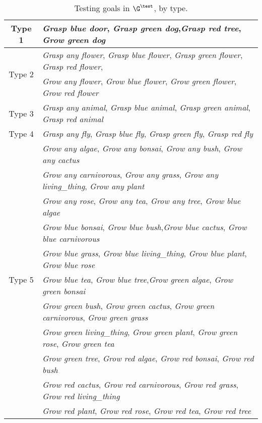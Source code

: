 \begin{table}[!h]
    \centering
    \caption{Testing goals in $\G^\test$, by type.}
    \label{tab:test_descriptions}
    \begin{tabular}{c|l}
        Type 1 & \textit{Grasp blue door}, \textit{Grasp green dog},\textit{Grasp red tree}, \textit{Grow green dog} \\ 
        \hline
        \multirow{2}{2.75em}{Type 2} & \textit{Grasp any flower}, \textit{Grasp blue flower}, \textit{Grasp green flower}, \textit{Grasp red flower}, \\
                                     & \textit{Grow any flower}, \textit{Grow blue flower}, \textit{Grow green flower}, \textit{Grow red flower}\\
        \hline
        Type 3 & \textit{Grasp any animal}, \textit{Grasp blue animal}, \textit{Grasp green animal}, \textit{Grasp red animal} \\ 
        \hline
       Type 4 & \textit{Grasp any fly}, \textit{Grasp blue fly}, \textit{Grasp green fly}, \textit{Grasp red fly} \\ 
        \hline
        \multirow{11}{2.75em}{Type 5} & \textit{Grow any algae}, \textit{Grow any bonsai}, \textit{Grow any bush}, \textit{Grow any cactus}\\
                                     & \textit{Grow any carnivorous}, \textit{Grow any grass}, \textit{Grow any living\_thing}, \textit{Grow any plant}\\
                                     & \textit{Grow any rose}, \textit{Grow any tea}, \textit{Grow any tree}, \textit{Grow blue algae}\\
                                     & \textit{Grow blue bonsai}, \textit{Grow blue bush},\textit{Grow blue cactus}, \textit{Grow blue carnivorous}\\
                                     & \textit{Grow blue grass}, \textit{Grow blue living\_thing}, \textit{Grow blue plant}, \textit{Grow blue rose}\\
                                     & \textit{Grow blue tea}, \textit{Grow blue tree},\textit{Grow green algae}, \textit{Grow green bonsai}\\
                                     & \textit{Grow green bush}, \textit{Grow green cactus},  \textit{Grow green carnivorous}, \textit{Grow green grass}\\
                                     & \textit{Grow green living\_thing}, \textit{Grow green plant}, \textit{Grow green rose}, \textit{Grow green tea}\\
                                     & \textit{Grow green tree}, \textit{Grow red algae}, \textit{Grow red bonsai}, \textit{Grow red bush}\\
                                     & \textit{Grow red cactus}, \textit{Grow red carnivorous}, \textit{Grow red grass}, \textit{Grow red living\_thing}\\
                                     & \textit{Grow red plant}, \textit{Grow red rose}, \textit{Grow red tea}, \textit{Grow red tree}\\
    \end{tabular}
\end{table}

